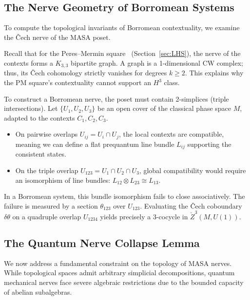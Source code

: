 \documentclass[11pt]{article}
\begin{document}
\subsection{The Nerve Geometry of Borromean Systems}

To compute the topological invariants of Borromean contextuality, we examine the \v{C}ech nerve of the MASA poset.

Recall that for the Peres--Mermin square~\cite{Peres90,Mermin90} (Section~\ref{sec:LHS}), the nerve of the contexts forms a $K_{3,3}$ bipartite graph. A graph is a 1-dimensional CW complex; thus, its \v{C}ech cohomology strictly vanishes for degrees $k \geq 2$. This explains why the PM square's contextuality cannot support an $H^3$ class.

To construct a Borromean nerve, the poset must contain 2-simplices (triple intersections). Let $\{U_1, U_2, U_3\}$ be an open cover of the classical phase space $M$, adapted to the contexts $C_1, C_2, C_3$.
\begin{itemize}
    \item On pairwise overlaps $U_{ij} = U_i \cap U_j$, the local contexts are compatible, meaning we can define a flat prequantum line bundle $L_{ij}$ supporting the consistent states.
    \item On the triple overlap $U_{123} = U_1 \cap U_2 \cap U_3$, global compatibility would require an isomorphism of line bundles: $L_{12} \otimes L_{23} \cong L_{13}$.
\end{itemize}

In a Borromean system, this bundle isomorphism fails to close associatively. The failure is measured by a section $\theta_{123}$ over $U_{123}$. Evaluating the \v{C}ech coboundary $\delta \theta$ on a quadruple overlap $U_{1234}$ yields precisely a 3-cocycle in $\check{Z}^3(M, U(1))$.

\subsection{The Quantum Nerve Collapse Lemma}

We now address a fundamental constraint on the topology of MASA nerves. While topological spaces admit arbitrary simplicial decompositions, quantum mechanical nerves face severe algebraic restrictions due to the bounded capacity of abelian subalgebras.
\end{document}
